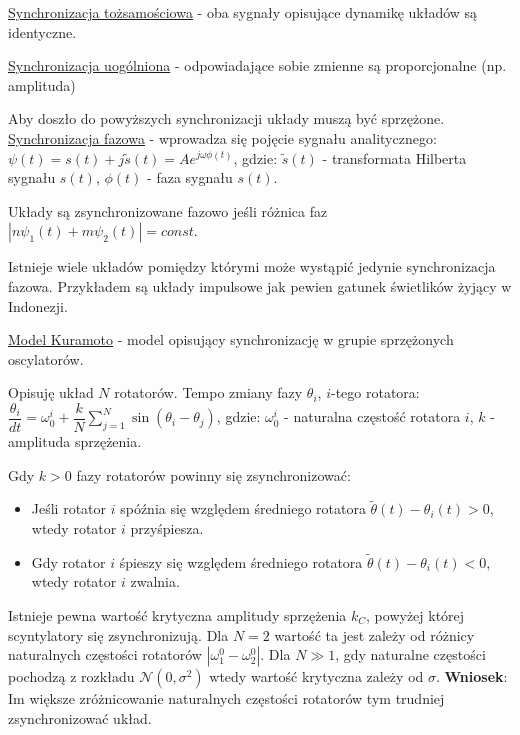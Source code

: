 \underline{Synchronizacja tożsamościowa} - oba sygnały opisujące dynamikę układów są identyczne.

\underline{Synchronizacja uogólniona} - odpowiadające sobie zmienne są proporcjonalne (np. amplituda)

Aby doszło do powyższych synchronizacji układy muszą być sprzężone.\newline
\newline
\underline{Synchronizacja fazowa} - wprowadza się pojęcie sygnału analitycznego: \newline
$ \psi(t) = s(t) + j\tilde{s}(t) = Ae^{j\omega\phi (t)} $, gdzie:\newline
$ \tilde{s}(t) $ - transformata Hilberta sygnału $ s(t) $,\newline
$ \phi (t) $ - faza sygnału $ s(t) $.

Układy są zsynchronizowane fazowo jeśli różnica faz $ |n\psi_1(t) + m\psi_2(t)| = const. $

Istnieje wiele układów pomiędzy którymi może wystąpić jedynie synchronizacja fazowa. Przykładem są układy impulsowe jak pewien gatunek świetlików żyjący w Indonezji.

\underline{Model Kuramoto} - model opisujący synchronizację w grupie sprzężonych oscylatorów.

Opisuję układ $ N $ rotatorów. Tempo zmiany fazy $ \theta_i $, $ i $-tego rotatora:\newline
$ \dfrac{\theta_i}{dt} = \omega_{0}^i + \dfrac{k}{N} \sum_{j=1}^N \sin (\theta_i - \theta_j) $, gdzie:\newline
$ \omega_{0}^i $ - naturalna częstość rotatora $ i $,\newline
$ k $ - amplituda sprzężenia.


Gdy $ k > 0 $ fazy rotatorów powinny się zsynchronizować:
\begin{itemize}
	\item Jeśli rotator $ i $ spóźnia się względem średniego rotatora $ \tilde{\theta}(t) - \theta_i(t) > 0 $, wtedy rotator $ i $ przyśpiesza.
	\item Gdy rotator $ i $ śpieszy się względem średniego rotatora $ \tilde{\theta}(t) - \theta_i(t) < 0 $, wtedy rotator $ i $ zwalnia.
\end{itemize}

Istnieje pewna wartość krytyczna amplitudy sprzężenia $ k_C $, powyżej której scyntylatory się zsynchronizują.  Dla $ N = 2 $ wartość ta jest zależy od różnicy naturalnych częstości rotatorów $ |\omega^0_1 - \omega^0_2| $. Dla $ N \gg 1 $, gdy naturalne częstości pochodzą z rozkładu $ \mathcal{N}(0, \sigma^2) $ wtedy wartość krytyczna zależy od $ \sigma $. \textbf{Wniosek}: Im większe zróżnicowanie naturalnych częstości rotatorów tym trudniej zsynchronizować układ.

